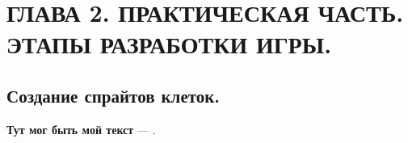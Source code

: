 \chapter{\label{ch:ch02}ГЛАВА 2. ПРАКТИЧЕСКАЯ ЧАСТЬ. ЭТАПЫ РАЗРАБОТКИ ИГРЫ.}

\section{\label{sec:ch02/sec01}Создание спрайтов клеток.}
\textbf{Тут мог быть мой текст} --- .

